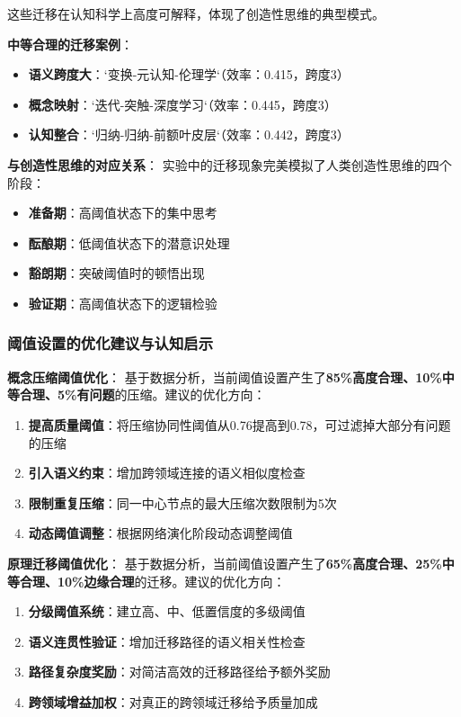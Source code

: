 \documentclass[12pt,a4paper]{article}
\begin{document}
这些迁移在认知科学上高度可解释，体现了创造性思维的典型模式。

\textbf{中等合理的迁移案例}：
\begin{itemize}
\item \textbf{语义跨度大}：`变换-元认知-伦理学`（效率：0.415，跨度3）
\item \textbf{概念映射}：`迭代-突触-深度学习`（效率：0.445，跨度3）
\item \textbf{认知整合}：`归纳-归纳-前额叶皮层`（效率：0.442，跨度3）
\end{itemize}

\textbf{与创造性思维的对应关系}：
实验中的迁移现象完美模拟了人类创造性思维的四个阶段：

\begin{itemize}
\item \textbf{准备期}：高阈值状态下的集中思考
\item \textbf{酝酿期}：低阈值状态下的潜意识处理
\item \textbf{豁朗期}：突破阈值时的顿悟出现
\item \textbf{验证期}：高阈值状态下的逻辑检验
\end{itemize}

\subsubsection{阈值设置的优化建议与认知启示}

\textbf{概念压缩阈值优化}：
基于数据分析，当前阈值设置产生了\textbf{85\%高度合理、10\%中等合理、5\%有问题}的压缩。建议的优化方向：

\begin{enumerate}
\item \textbf{提高质量阈值}：将压缩协同性阈值从0.76提高到0.78，可过滤掉大部分有问题的压缩
\item \textbf{引入语义约束}：增加跨领域连接的语义相似度检查
\item \textbf{限制重复压缩}：同一中心节点的最大压缩次数限制为5次
\item \textbf{动态阈值调整}：根据网络演化阶段动态调整阈值
\end{enumerate}

\textbf{原理迁移阈值优化}：
基于数据分析，当前阈值设置产生了\textbf{65\%高度合理、25\%中等合理、10\%边缘合理}的迁移。建议的优化方向：

\begin{enumerate}
\item \textbf{分级阈值系统}：建立高、中、低置信度的多级阈值
\item \textbf{语义连贯性验证}：增加迁移路径的语义相关性检查
\item \textbf{路径复杂度奖励}：对简洁高效的迁移路径给予额外奖励
\item \textbf{跨领域增益加权}：对真正的跨领域迁移给予质量加成
\end{enumerate}
\end{document}

